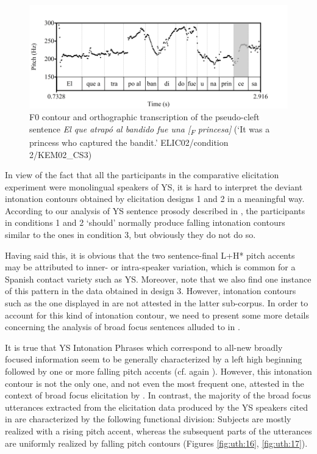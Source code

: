 \documentclass[output=paper]{langsci/langscibook}
\begin{document}
\begin{figure}
\includegraphics[width=\textwidth]{figures/UTH-img38.png}
\caption{F0 contour and orthographic transcription of the pseudo-cleft sentence \textit{El que atrapó al bandido fue una [\textsubscript{F}} \textit{princesa]} (‘It was a princess who captured the bandit.' ELIC02/condition 2/KEM02\_CS3)}
\label{fig:uth:15}
\end{figure}

In view of the fact that all the participants in the comparative elicitation experiment were monolingual speakers of YS, it is hard to interpret the deviant intonation contours obtained by elicitation designs 1 and 2 in a meaningful way. According to our analysis of YS sentence prosody described in , the participants in conditions 1 and 2 ‘should' normally produce falling intonation contours similar to the ones in condition 3, but obviously they do not do so.

Having said this, it is obvious that the two sentence-final L+H* pitch accents may be attributed to inner- or intra-speaker variation, which is common for a Spanish contact variety such as YS. Moreover, note that we also find one instance of this pattern in the data obtained in design 3. However, intonation contours such as the one displayed in  are not attested in the latter sub-corpus. In order to account for this kind of intonation contour, we need to present some more details concerning the analysis of broad focus sentences alluded to in . 

It is true that YS Intonation Phrases which correspond to all-new broadly focused information seem to be generally characterized by a left high beginning followed by one or more falling pitch accents (cf. again ). However, this intonation contour is not the only one, and not even the most frequent one, attested in the context of broad focus elicitation by \citet{Uth16}. In contrast, the majority of the broad focus utterances extracted from the elicitation data produced by the YS speakers cited in \citet{Uth16} are characterized by the following functional division: Subjects are mostly realized with a rising pitch accent, whereas the subsequent parts of the utterances are uniformly realized by falling pitch contours (Figures \ref{fig:uth:16}, \ref{fig:uth:17}).
\end{document}
